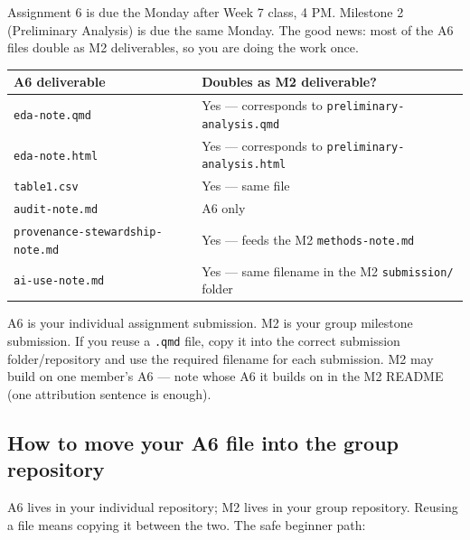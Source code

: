 \documentclass[
  letterpaper,
  DIV=11,
  numbers=noendperiod,
  oneside]{scrreprt}
\begin{document}

Assignment 6 is due the Monday after Week 7 class, 4 PM. Milestone 2
(Preliminary Analysis) is due the same Monday. The good news: most of
the A6 files double as M2 deliverables, so you are doing the work once.

\begin{longtable}[]{@{}
  >{\raggedright\arraybackslash}p{}
  >{\raggedright\arraybackslash}p{}@{}}
\toprule\noalign{}
\begin{minipage}[b]{\linewidth}\raggedright
A6 deliverable
\end{minipage} & \begin{minipage}[b]{\linewidth}\raggedright
Doubles as M2 deliverable?
\end{minipage} \\
\midrule\noalign{}
\endhead
\bottomrule\noalign{}
\endlastfoot
\texttt{eda-note.qmd} & Yes --- corresponds to
\texttt{preliminary-analysis.qmd} \\
\texttt{eda-note.html} & Yes --- corresponds to
\texttt{preliminary-analysis.html} \\
\texttt{table1.csv} & Yes --- same file \\
\texttt{audit-note.md} & A6 only \\
\texttt{provenance-stewardship-note.md} & Yes --- feeds the M2
\texttt{methods-note.md} \\
\texttt{ai-use-note.md} & Yes --- same filename in the M2
\texttt{submission/} folder \\
\end{longtable}

A6 is your individual assignment submission. M2 is your group milestone
submission. If you reuse a \texttt{.qmd} file, copy it into the correct
submission folder/repository and use the required filename for each
submission. M2 may build on one member's A6 --- note whose A6 it builds
on in the M2 README (one attribution sentence is enough).

\subsection*{How to move your A6 file into the group
repository}\label{how-to-move-your-a6-file-into-the-group-repository}

A6 lives in your individual repository; M2 lives in your group
repository. Reusing a file means copying it between the two. The safe
beginner path:
\end{document}
